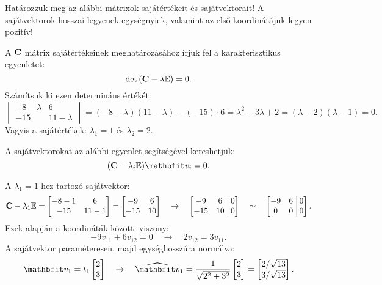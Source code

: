 \begin{exercise}{%
    Határozzuk meg az alábbi mátrixok sajátértékeit és sajátvektorait!
    A sajátvektorok hosszai legyenek egységnyiek, valamint az első koordinátájuk
    legyen pozitív!
  }
{  A $\mathbf{C}$ mátrix sajátértékeinek meghatározásához írjuk fel a
  karakterisztikus egyenletet:
  \[
    \det \left( \mathbf{C} - \lambda {\mathbb{E}} \right) = 0
    \text{.}
  \]
  Számítsuk ki ezen determináns értékét:
  \[
    \begin{vmatrix}
      -8 - \lambda & 6           \\
      -15          & 11 -\lambda
    \end{vmatrix}
    = (-8 - \lambda)(11 - \lambda) - (-15) \cdot 6
    = \lambda^2 - 3\lambda + 2
    = (\lambda - 2)(\lambda - 1)
    = 0
    \text{.}
  \]
  Vagyis a sajátértékek: $\lambda_1 = 1$ és $\lambda_2 = 2$.

  \vspace{.66em}
  A sajátvektorokat az alábbi egyenlet segítségével kereshetjük:
  \[
    (\rmat C - \lambda_i \imat) \rvec v_i = 0
    \text{.}
  \]

  A $\lambda_1 = 1$-hez tartozó sajátvektor:
  \[
    \mathbf{C} - \lambda_1 {\mathbb{E}} = \begin{bmatrix}
      -8 - 1 & 6      \\
      -15    & 11 - 1
    \end{bmatrix} = \begin{bmatrix}
      -9  & 6  \\
      -15 & 10
    \end{bmatrix}
    \quad \rightarrow \quad
    \left[\begin{matrix}
        -9  & 6  \\
        -15 & 10
      \end{matrix}\right.\left|\begin{matrix}
        \,0 \\ \,0
      \end{matrix}\right]
    \quad \sim \quad
    \left[\begin{matrix}
        -9 & 6 \\
        0  & 0
      \end{matrix}\right.\left|\begin{matrix}
        \,0 \\ \,0
      \end{matrix}\right]
    \text{.}
  \]
  Ezek alapján a koordináták közötti viszony:
  \[
    -9v_{11} + 6v_{12} = 0
    \quad \rightarrow \quad
    2 v_{12} = 3 v_{11}
    \text{.}
  \]
  A sajátvektor paraméteresen, majd egységhosszúra normálva:
  \[
    \rvec v_1 = t_1 \begin{bmatrix}
      2 \\ 3
    \end{bmatrix}
    \quad
    \rightarrow
    \quad
    \uvec v_1 = \frac{1}{\sqrt{2^2 + 3^2}}\begin{bmatrix}
      2 \\ 3
    \end{bmatrix} = \begin{bmatrix}
      2 / \sqrt{13} \\
      3 / \sqrt{13}
    \end{bmatrix}
    \text{.}
  \]

}
\end{exercise}

